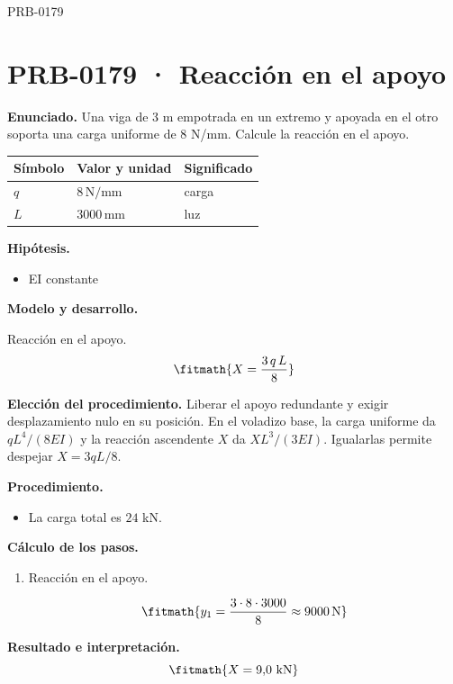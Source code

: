 \begin{studiumworked}{PRB-0179}

\section{PRB-0179 · Reacción en el apoyo}

\textbf{Enunciado.} Una viga de 3 m empotrada en un extremo y apoyada en el otro soporta una carga uniforme de 8 N/mm. Calcule la reacción en el apoyo.

\par\medskip\noindent\begin{tabular}{@{}p{.18\linewidth}p{.26\linewidth}p{.48\linewidth}@{}}
\toprule Símbolo & Valor y unidad & Significado\\\midrule
$q$ & $8\,\mathrm{N/mm}$ & carga\\
$L$ & $3000\,\mathrm{mm}$ & luz\\
\bottomrule\end{tabular}\par\medskip

\textbf{Hipótesis.}\begin{itemize}\item EI constante\end{itemize}

\textbf{Modelo y desarrollo.}

Reacción en el apoyo.\[\fitmath{X = \frac{3\,q\,L}{8}}\]

\textbf{Elección del procedimiento.} Liberar el apoyo redundante y exigir desplazamiento nulo en su posición. En el voladizo base, la carga uniforme da $qL^4/(8EI)$ y la reacción ascendente $X$ da $XL^3/(3EI)$. Igualarlas permite despejar $X=3qL/8$.

\textbf{Procedimiento.}\begin{itemize}\item La carga total es $24$ kN.\end{itemize}

\textbf{Cálculo de los pasos.}

\begin{enumerate}

\item Reacción en el apoyo.

\[\fitmath{y_{1}=\frac{3\cdot 8\cdot 3000}{8}\approx 9000\,\mathrm{N}}\]

\end{enumerate}

\textbf{Resultado e interpretación.}\[\fitmath{X = 9{,}0\ \mathrm{kN}}\]


\end{studiumworked}
